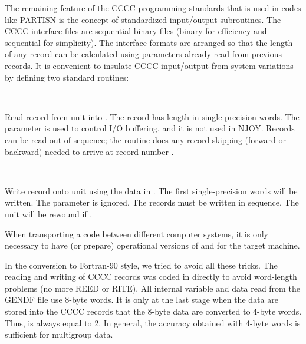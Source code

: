 The remaining feature of the CCCC programming standards that is used
in codes like PARTISN is the concept of standardized input/output subroutines.
The CCCC interface files are sequential binary files (binary for
efficiency and sequential for simplicity).  The interface formats are
arranged so that the length of any record can be calculated using
parameters already read from previous records.  It is convenient to
insulate CCCC input/output from system variations by defining two
standard routines:

\begin{description}
\begin{singlespace}

\item[\cword{REED(NREF,IREC,ARRAY,NWDS,MODE)}] ~\par
  Read record  from unit  into
  .  The record has length 
  in single-precision words.  The  parameter
  is used to control I/O buffering, and it is not used
  in NJOY. Records can be read out of sequence; the
  routine does any record skipping (forward or backward)
  needed to arrive at record number .
\item[\cword{RITE(NREF,IREC,ARRAY,NWDS,MODE)}] ~\par
  Write record  onto unit  using
  the data in .  The first 
  single-precision words will be written.  The 
  parameter is ignored.  The records  must be
  written in sequence.  The unit will be rewound if
  .

\end{singlespace}
\end{description}

\noindent
When transporting a code between different computer systems,
it is only necessary to have (or prepare) operational versions
of  and  for the target machine.

In the conversion to Fortran-90 style, we tried to avoid all these
tricks.  The reading and writing of CCCC records was coded in
directly to avoid word-length problems (no more REED or RITE).  All
internal variable and data read from the GENDF file use 8-byte words.
It is only at the last stage when the data are stored into the CCCC
records that the 8-byte data are converted to 4-byte words.  Thus,
 is always equal to 2.  In general, the accuracy
obtained with 4-byte words is sufficient for multigroup data.

